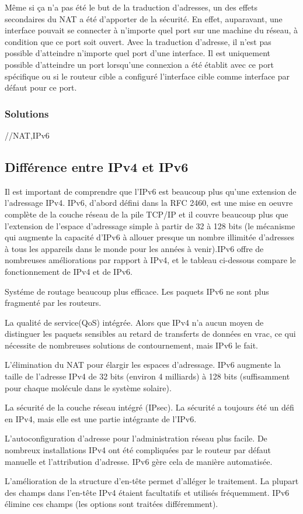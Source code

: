 Même si ça n'a pas été le but de la traduction d'adresses, un des effets
secondaires du NAT a été d'apporter de la sécurité. En effet, auparavant, une
interface pouvait se connecter à n'importe quel port sur une machine du réseau,
à condition que ce port soit ouvert. Avec la traduction d'adresse, il n'est pas
possible d'atteindre n'importe quel port d'une interface. Il est uniquement
possible d'atteindre un port lorsqu'une connexion a été établit avec ce port
spécifique ou si le routeur cible a configuré l'interface cible comme interface
par défaut pour ce port.


\subsubsection{Solutions}
//NAT,IPv6
\subsection{Différence entre IPv4 et IPv6}


Il est important de comprendre que l'IPv6 est beaucoup plus qu'une extension de
l'adressage IPv4. IPv6, d'abord défini dans la RFC 2460, est une mise en oeuvre
complète de la couche réseau de la pile TCP/IP et il couvre beaucoup plus que
l'extension de l'espace d'adressage simple à partir de 32 à 128 bits (le
mécanisme qui augmente la capacité d'IPv6 à allouer presque un nombre illimitée
d'adresses à tous les appareils dans le monde pour les années à venir).IPv6
offre de nombreuses améliorations par rapport à IPv4, et le tableau ci-dessous
compare le fonctionnement de IPv4 et de IPv6.

Systéme de routage beaucoup plus efficace. Les paquets IPv6 ne sont plus
fragmenté par les routeurs.
	
La qualité de service(QoS) intégrée. Alors que IPv4 n'a aucun moyen de
distinguer les paquets sensibles au retard de transferts de données en vrac, ce
qui nécessite de nombreuses solutions de contournement, mais IPv6 le fait.
	
L'élimination du NAT pour élargir les espaces d'adressage. IPv6 augmente la
taille de l'adresse IPv4 de 32 bits (environ 4 milliards) à 128 bits
(suffisamment pour chaque molécule dans le système solaire).
	
La sécurité de la couche réseau intégré (IPsec). La sécurité a toujours été
un défi en IPv4, mais elle est une partie intégrante de l'IPv6.
	
L'autoconfiguration d'adresse pour l'administration réseau plus facile. De
nombreux installations IPv4 ont été compliquées par le routeur par défaut
manuelle et l'attribution d'adresse. IPv6 gère cela de manière automatisée.
	
L'amélioration de la structure d'en-tête permet d'alléger le traitement. La
plupart des champs dans l'en-tête IPv4 étaient facultatifs et utilisés
fréquemment. IPv6 élimine ces champs (les options sont traitées différemment).
